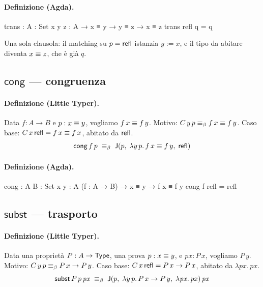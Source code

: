 \paragraph{Definizione (Agda).}
\begin{agda}
trans : {A : Set} {x y z : A} → x ≡ y → y ≡ z → x ≡ z
trans refl q = q
\end{agda}

Una sola clausola: il matching su $p = \mathsf{refl}$ istanzia $y := x$, e il tipo da abitare diventa $x \equiv z$, che \`e gi\`a $q$.

\subsection*{$\mathsf{cong}$ --- congruenza}

\paragraph{Definizione (Little Typer).} Data $f : A \to B$ e $p : x \equiv y$, vogliamo $f\,x \equiv f\,y$. Motivo: $C\,y\,p \equiv_{\beta} f\,x \equiv f\,y$. Caso base: $C\,x\,\mathsf{refl} = f\,x \equiv f\,x$, abitato da $\mathsf{refl}$.
\[
\mathsf{cong}\,f\,p \;\equiv_{\beta}\; \mathsf{J}(p,\;\lambda y\,p.\,f\,x \equiv f\,y,\;\mathsf{refl})
\]

\paragraph{Definizione (Agda).}
\begin{agda}
cong : {A B : Set} {x y : A} (f : A → B) → x ≡ y → f x ≡ f y
cong f refl = refl
\end{agda}

\subsection*{$\mathsf{subst}$ --- trasporto}

\paragraph{Definizione (Little Typer).} Data una propriet\`a $P : A \to \mathsf{Type}$, una prova $p : x \equiv y$, e $\mathit{px} : P\,x$, vogliamo $P\,y$. Motivo: $C\,y\,p \equiv_{\beta} P\,x \to P\,y$. Caso base: $C\,x\,\mathsf{refl} = P\,x \to P\,x$, abitato da $\lambda\mathit{px}.\,\mathit{px}$.
\[
\mathsf{subst}\,P\,p\,\mathit{px} \;\equiv_{\beta}\; \mathsf{J}(p,\;\lambda y\,p.\,P\,x \to P\,y,\;\lambda \mathit{px}.\,\mathit{px})\,\mathit{px}
\]

